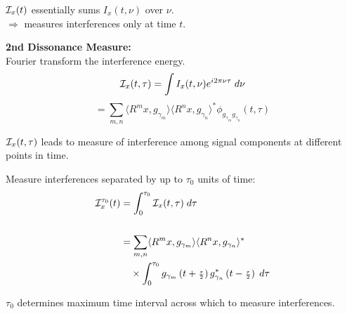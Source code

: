 \documentclass{slides}
\begin{document}


\begin{slide}%
$\mathcal{I}_x(t)$ essentially sums $I_x(t,\nu)$ over $\nu$.\\
$\Rightarrow$ measures interferences only at time $t$.

{\bf 2nd Dissonance Measure:}\\
Fourier transform the interference energy.
\[  
\mathcal{I}_x(t,\tau) = \int I_x(t,\nu)e^{i2\pi\nu\tau}\; d\nu  
\]
\[
= \sum_{m, n}\langle R^mx,g_{\gamma_m}\rangle \langle R^nx,g_{\gamma_n}\rangle^* 
\phi_{g_{\gamma_m}g_{\gamma_n}}(t,\tau)
\]

$\mathcal{I}_x(t,\tau)$ leads to measure of interference
among signal components at different points in time.

\end{slide}

\begin{slide}%
Measure interferences separated by up to
$\tau_0$ units of time:
\begin{align*}
\mathcal{I}_x^{\tau_0}(t) &= \int_0^{\tau_0} \mathcal{I}_x(t,\tau)\; d\tau\\
\\
&=\sum_{m, n} \langle R^mx,g_{\gamma_m}\rangle \langle
                      R^nx,g_{\gamma_n}\rangle^* \\
&\quad \times \int_0^{\tau_0} g_{\gamma_m}\left(t+{\scriptstyle \frac{\tau}{2}}\right) g^*_{\gamma_n}\left(t-{\scriptstyle \frac{\tau}{2}}\right)\;d\tau
\end{align*}

$\tau_0$ determines maximum time interval across which to measure interferences.
\end{slide}
\end{document}
